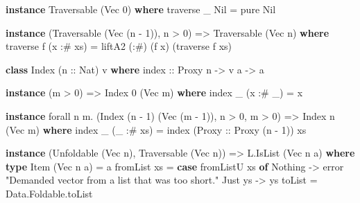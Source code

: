 \documentclass[]{article}
\newenvironment{Shaded}{}{}
\newcommand{\DataTypeTok}[1]{\textcolor[rgb]{0.56,0.13,0.00}{#1}}
\newcommand{\DecValTok}[1]{\textcolor[rgb]{0.25,0.63,0.44}{#1}}
\newcommand{\FunctionTok}[1]{\textcolor[rgb]{0.02,0.16,0.49}{#1}}
\newcommand{\KeywordTok}[1]{\textcolor[rgb]{0.00,0.44,0.13}{\textbf{#1}}}
\newcommand{\NormalTok}[1]{#1}
\newcommand{\OtherTok}[1]{\textcolor[rgb]{0.00,0.44,0.13}{#1}}
\newcommand{\StringTok}[1]{\textcolor[rgb]{0.25,0.44,0.63}{#1}}
\begin{document}
\begin{Shaded}
\begin{Highlighting}[]
\KeywordTok{instance} \DataTypeTok{Traversable}\NormalTok{ (}\DataTypeTok{Vec} \DecValTok{0}\NormalTok{) }\KeywordTok{where}
\NormalTok{    traverse _ }\DataTypeTok{Nil} \FunctionTok{=}\NormalTok{ pure }\DataTypeTok{Nil}

\KeywordTok{instance}\NormalTok{ (}\DataTypeTok{Traversable}\NormalTok{ (}\DataTypeTok{Vec}\NormalTok{ (n }\FunctionTok{-} \DecValTok{1}\NormalTok{)), n }\FunctionTok{>} \DecValTok{0}\NormalTok{) }\OtherTok{=>} \DataTypeTok{Traversable}\NormalTok{ (}\DataTypeTok{Vec}\NormalTok{ n) }\KeywordTok{where}
\NormalTok{    traverse f (x }\FunctionTok{:#}\NormalTok{ xs) }\FunctionTok{=}\NormalTok{ liftA2 (}\FunctionTok{:#}\NormalTok{) (f x) (traverse f xs)}

\KeywordTok{class} \DataTypeTok{Index}\NormalTok{ (}\OtherTok{n ::} \DataTypeTok{Nat}\NormalTok{) v }\KeywordTok{where}
\OtherTok{    index ::} \DataTypeTok{Proxy}\NormalTok{ n }\OtherTok{->}\NormalTok{ v a }\OtherTok{->}\NormalTok{ a}

\KeywordTok{instance}\NormalTok{ (m }\FunctionTok{>} \DecValTok{0}\NormalTok{) }\OtherTok{=>} \DataTypeTok{Index} \DecValTok{0}\NormalTok{ (}\DataTypeTok{Vec}\NormalTok{ m) }\KeywordTok{where}
\NormalTok{    index _ (x }\FunctionTok{:#}\NormalTok{ _) }\FunctionTok{=}\NormalTok{ x}

\KeywordTok{instance}\NormalTok{ forall n m}\FunctionTok{.}\NormalTok{ (}\DataTypeTok{Index}\NormalTok{ (n }\FunctionTok{-} \DecValTok{1}\NormalTok{) (}\DataTypeTok{Vec}\NormalTok{ (m }\FunctionTok{-} \DecValTok{1}\NormalTok{)), n }\FunctionTok{>} \DecValTok{0}\NormalTok{, m }\FunctionTok{>} \DecValTok{0}\NormalTok{) }\OtherTok{=>} \DataTypeTok{Index}\NormalTok{ n (}\DataTypeTok{Vec}\NormalTok{ m) }\KeywordTok{where}
\NormalTok{    index _ (_ }\FunctionTok{:#}\NormalTok{ xs) }\FunctionTok{=}\NormalTok{ index (}\DataTypeTok{Proxy}\OtherTok{ ::} \DataTypeTok{Proxy}\NormalTok{ (n }\FunctionTok{-} \DecValTok{1}\NormalTok{)) xs}

\KeywordTok{instance}\NormalTok{ (}\DataTypeTok{Unfoldable}\NormalTok{ (}\DataTypeTok{Vec}\NormalTok{ n), }\DataTypeTok{Traversable}\NormalTok{ (}\DataTypeTok{Vec}\NormalTok{ n)) }\OtherTok{=>} \DataTypeTok{L.IsList}\NormalTok{ (}\DataTypeTok{Vec}\NormalTok{ n a) }\KeywordTok{where}
    \KeywordTok{type} \DataTypeTok{Item}\NormalTok{ (}\DataTypeTok{Vec}\NormalTok{ n a) }\FunctionTok{=}\NormalTok{ a}
\NormalTok{    fromList xs }\FunctionTok{=} \KeywordTok{case}\NormalTok{ fromListU xs }\KeywordTok{of}
                    \DataTypeTok{Nothing} \OtherTok{->}\NormalTok{ error }\StringTok{"Demanded vector from a list that was too short."}
                    \DataTypeTok{Just}\NormalTok{ ys }\OtherTok{->}\NormalTok{ ys}
\NormalTok{    toList      }\FunctionTok{=}\NormalTok{ Data.Foldable.toList}
\end{Highlighting}
\end{Shaded}
\end{document}
